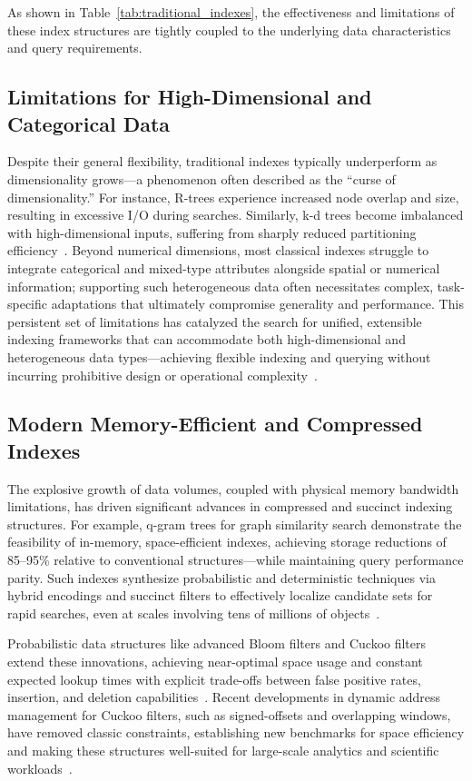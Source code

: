 \documentclass[sigconf]{acmart}
\begin{document}
As shown in Table~\ref{tab:traditional_indexes}, the effectiveness and limitations of these index structures are tightly coupled to the underlying data characteristics and query requirements.

\subsection{Limitations for High-Dimensional and Categorical Data}

Despite their general flexibility, traditional indexes typically underperform as dimensionality grows—a phenomenon often described as the “curse of dimensionality.” For instance, R-trees experience increased node overlap and size, resulting in excessive I/O during searches. Similarly, k-d trees become imbalanced with high-dimensional inputs, suffering from sharply reduced partitioning efficiency~\cite{ref111,ref112}. Beyond numerical dimensions, most classical indexes struggle to integrate categorical and mixed-type attributes alongside spatial or numerical information; supporting such heterogeneous data often necessitates complex, task-specific adaptations that ultimately compromise generality and performance. This persistent set of limitations has catalyzed the search for unified, extensible indexing frameworks that can accommodate both high-dimensional and heterogeneous data types—achieving flexible indexing and querying without incurring prohibitive design or operational complexity~\cite{ref111,ref112}.

\subsection{Modern Memory-Efficient and Compressed Indexes}

The explosive growth of data volumes, coupled with physical memory bandwidth limitations, has driven significant advances in compressed and succinct indexing structures. For example, q-gram trees for graph similarity search demonstrate the feasibility of in-memory, space-efficient indexes, achieving storage reductions of 85--95\% relative to conventional structures—while maintaining query performance parity. Such indexes synthesize probabilistic and deterministic techniques via hybrid encodings and succinct filters to effectively localize candidate sets for rapid searches, even at scales involving tens of millions of objects~\cite{ref80}. 

Probabilistic data structures like advanced Bloom filters and Cuckoo filters extend these innovations, achieving near-optimal space usage and constant expected lookup times with explicit trade-offs between false positive rates, insertion, and deletion capabilities~\cite{ref81,ref82}. Recent developments in dynamic address management for Cuckoo filters, such as signed-offsets and overlapping windows, have removed classic constraints, establishing new benchmarks for space efficiency and making these structures well-suited for large-scale analytics and scientific workloads~\cite{ref82}.
 
\end{document}
